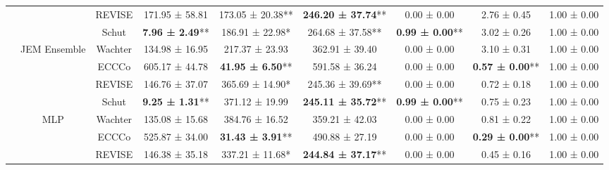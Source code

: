 \begin{table}
{\begin{tabular}[t]{>{}c|c|c|c|c|c|c|c|c}
 &  & REVISE & 171.95 ± 58.81\hphantom{*}\hphantom{*} & 173.05 ± 20.38** & \textbf{246.20 ± 37.74}** & 0.00 ± 0.00\hphantom{*}\hphantom{*} & 2.76 ± 0.45\hphantom{*}\hphantom{*} & 1.00 ± 0.00\hphantom{*}\hphantom{*}\\

 &  & Schut & \textbf{7.96 ± 2.49}** & 186.91 ± 22.98*\hphantom{*} & 264.68 ± 37.58** & \textbf{0.99 ± 0.00}** & 3.02 ± 0.26\hphantom{*}\hphantom{*} & 1.00 ± 0.00\hphantom{*}\hphantom{*}\\

 & \multirow{-4}{*}{\centering\arraybackslash JEM Ensemble} & Wachter & 134.98 ± 16.95\hphantom{*}\hphantom{*} & 217.37 ± 23.93\hphantom{*}\hphantom{*} & 362.91 ± 39.40\hphantom{*}\hphantom{*} & 0.00 ± 0.00\hphantom{*}\hphantom{*} & 3.10 ± 0.31\hphantom{*}\hphantom{*} & 1.00 ± 0.00\hphantom{*}\hphantom{*}\\
\cline{2-9}
 &  & ECCCo & 605.17 ± 44.78\hphantom{*}\hphantom{*} & \textbf{41.95 ± 6.50}** & 591.58 ± 36.24\hphantom{*}\hphantom{*} & 0.00 ± 0.00\hphantom{*}\hphantom{*} & \textbf{0.57 ± 0.00}** & 1.00 ± 0.00\hphantom{*}\hphantom{*}\\

 &  & REVISE & 146.76 ± 37.07\hphantom{*}\hphantom{*} & 365.69 ± 14.90*\hphantom{*} & 245.36 ± 39.69** & 0.00 ± 0.00\hphantom{*}\hphantom{*} & 0.72 ± 0.18\hphantom{*}\hphantom{*} & 1.00 ± 0.00\hphantom{*}\hphantom{*}\\

 &  & Schut & \textbf{9.25 ± 1.31}** & 371.12 ± 19.99\hphantom{*}\hphantom{*} & \textbf{245.11 ± 35.72}** & \textbf{0.99 ± 0.00}** & 0.75 ± 0.23\hphantom{*}\hphantom{*} & 1.00 ± 0.00\hphantom{*}\hphantom{*}\\

 & \multirow{-4}{*}{\centering\arraybackslash MLP} & Wachter & 135.08 ± 15.68\hphantom{*}\hphantom{*} & 384.76 ± 16.52\hphantom{*}\hphantom{*} & 359.21 ± 42.03\hphantom{*}\hphantom{*} & 0.00 ± 0.00\hphantom{*}\hphantom{*} & 0.81 ± 0.22\hphantom{*}\hphantom{*} & 1.00 ± 0.00\hphantom{*}\hphantom{*}\\
\cline{2-9}
 &  & ECCCo & 525.87 ± 34.00\hphantom{*}\hphantom{*} & \textbf{31.43 ± 3.91}** & 490.88 ± 27.19\hphantom{*}\hphantom{*} & 0.00 ± 0.00\hphantom{*}\hphantom{*} & \textbf{0.29 ± 0.00}** & 1.00 ± 0.00\hphantom{*}\hphantom{*}\\

 &  & REVISE & 146.38 ± 35.18\hphantom{*}\hphantom{*} & 337.21 ± 11.68*\hphantom{*} & \textbf{244.84 ± 37.17}** & 0.00 ± 0.00\hphantom{*}\hphantom{*} & 0.45 ± 0.16\hphantom{*}\hphantom{*} & 1.00 ± 0.00\hphantom{*}\hphantom{*}\\


\end{tabular}}
\end{table}
